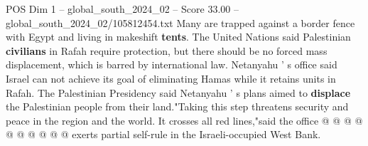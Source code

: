 \begin{textsample}{POS Dim 1 – global\_south\_2024\_02 – Score 33.00 – global\_south\_2024\_02/105812454.txt}
Many are trapped against a border fence with Egypt and living in makeshift \textbf{tents}.
The United Nations said Palestinian \textbf{civilians} in Rafah require protection, but there should be no forced mass displacement, which is barred by international law.
Netanyahu ' s office said Israel can not achieve its goal of eliminating Hamas while it retains units in Rafah.
The Palestinian Presidency said Netanyahu ' s plans aimed to \textbf{displace} the Palestinian people from their land."Taking this step threatens security and peace in the region and the world.
It crosses all red lines,"said the office @ @ @ @ @ @ @ @ @ @ exerts partial self-rule in the Israeli-occupied West Bank.

\end{textsample}
